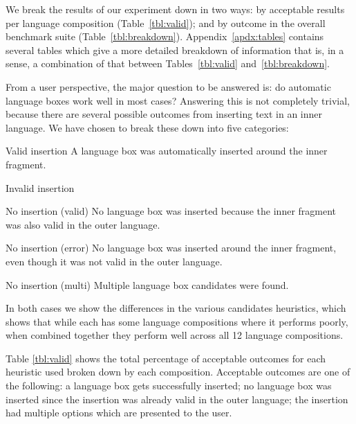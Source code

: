 \documentclass[sigplan,screen]{acmart}\settopmatter{printfolios=true,printccs=false,printacmref=false}
\begin{document}
We break the results of our experiment down in two ways: by acceptable results
per language composition (Table~\ref{tbl:valid}); and by outcome in the
overall benchmark suite (Table~\ref{tbl:breakdown}). Appendix~\ref{apdx:tables}
contains several tables which give a more detailed breakdown of information
that is, in a sense, a combination of that between Tables~\ref{tbl:valid}
and~\ref{tbl:breakdown}.

From a user perspective, the major question to be answered is: do automatic language boxes work well in most cases? Answering this is not completely trivial, because there are several possible outcomes from inserting text in an inner language. We have chosen to break these down into five categories:

\begin{description*}
  \item[Valid insertion] A language box was automatically inserted around the inner fragment.
  \item[Invalid insertion] 
  \item[No insertion (valid)] No language box was inserted because the inner fragment was also valid in the outer language.
  \item[No insertion (error)] No language box was inserted around the inner fragment, even though it was not valid in the outer language.
  \item[No insertion (multi)] Multiple language box candidates were found.
\end{description*}

In both cases we show
the differences in the various candidates heuristics, which shows that while
each has some language compositions where it performs poorly, when combined
together they perform well across all 12 language compositions.

Table \ref{tbl:valid} shows the total percentage of
acceptable outcomes for each heuristic used broken down by each composition.
Acceptable outcomes are one of the following: a language box gets successfully
inserted; no language box was inserted since the insertion was already valid in
the outer language; the insertion had multiple options which are presented to
the user.
\end{document}
